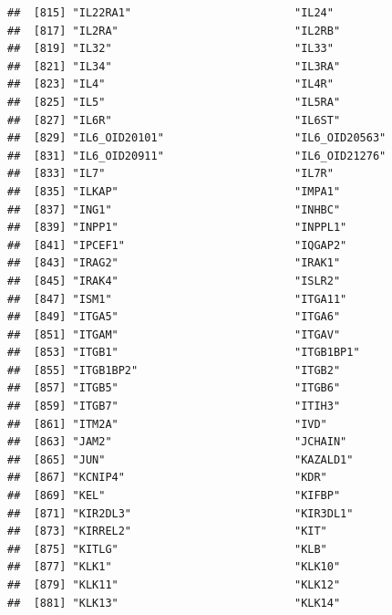 \documentclass[
]{article}
\begin{document}
\begin{verbatim}
##  [815] "IL22RA1"                         "IL24"                           
##  [817] "IL2RA"                           "IL2RB"                          
##  [819] "IL32"                            "IL33"                           
##  [821] "IL34"                            "IL3RA"                          
##  [823] "IL4"                             "IL4R"                           
##  [825] "IL5"                             "IL5RA"                          
##  [827] "IL6R"                            "IL6ST"                          
##  [829] "IL6_OID20101"                    "IL6_OID20563"                   
##  [831] "IL6_OID20911"                    "IL6_OID21276"                   
##  [833] "IL7"                             "IL7R"                           
##  [835] "ILKAP"                           "IMPA1"                          
##  [837] "ING1"                            "INHBC"                          
##  [839] "INPP1"                           "INPPL1"                         
##  [841] "IPCEF1"                          "IQGAP2"                         
##  [843] "IRAG2"                           "IRAK1"                          
##  [845] "IRAK4"                           "ISLR2"                          
##  [847] "ISM1"                            "ITGA11"                         
##  [849] "ITGA5"                           "ITGA6"                          
##  [851] "ITGAM"                           "ITGAV"                          
##  [853] "ITGB1"                           "ITGB1BP1"                       
##  [855] "ITGB1BP2"                        "ITGB2"                          
##  [857] "ITGB5"                           "ITGB6"                          
##  [859] "ITGB7"                           "ITIH3"                          
##  [861] "ITM2A"                           "IVD"                            
##  [863] "JAM2"                            "JCHAIN"                         
##  [865] "JUN"                             "KAZALD1"                        
##  [867] "KCNIP4"                          "KDR"                            
##  [869] "KEL"                             "KIFBP"                          
##  [871] "KIR2DL3"                         "KIR3DL1"                        
##  [873] "KIRREL2"                         "KIT"                            
##  [875] "KITLG"                           "KLB"                            
##  [877] "KLK1"                            "KLK10"                          
##  [879] "KLK11"                           "KLK12"                          
##  [881] "KLK13"                           "KLK14"                          

\end{verbatim}
\end{document}
